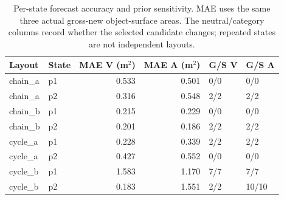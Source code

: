 \begin{table}[t]
\centering
\caption{Per-state forecast accuracy and prior sensitivity. MAE uses the same three actual gross-new object-surface areas. The neutral/category columns record whether the selected candidate changes; repeated states are not independent layouts.}
\label{tab:paired-gain-state-errors}
\begin{tabular}{llrrll}
\toprule
Layout & State & MAE V (m$^2$) & MAE A (m$^2$) & G/S V & G/S A \\
\midrule
chain\_a & p1 & 0.533 & 0.501 & 0/0 & 0/0 \\
chain\_a & p2 & 0.316 & 0.548 & 2/2 & 2/2 \\
chain\_b & p1 & 0.215 & 0.229 & 0/0 & 0/0 \\
chain\_b & p2 & 0.201 & 0.186 & 2/2 & 2/2 \\
cycle\_a & p1 & 0.228 & 0.339 & 2/2 & 2/2 \\
cycle\_a & p2 & 0.427 & 0.552 & 0/0 & 0/0 \\
cycle\_b & p1 & 1.583 & 1.170 & 7/7 & 7/7 \\
cycle\_b & p2 & 0.183 & 1.551 & 2/2 & 10/10 \\
\bottomrule
\end{tabular}
\end{table}
